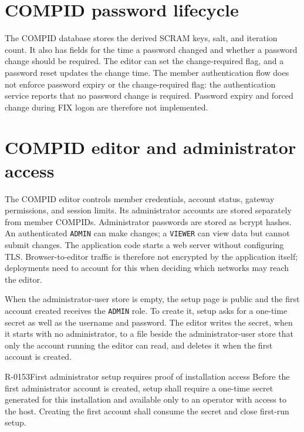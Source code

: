 \section{COMPID password lifecycle}
\label{sec:security:compid_password_lifecycle}

The COMPID database stores the derived SCRAM keys, salt, and iteration count.
It also has fields for the time a password changed and whether a password
change should be required. The editor can set the change-required flag, and a
password reset updates the change time. The member authentication flow does
not enforce password expiry or the change-required flag: the authentication
service reports that no password change is required. Password expiry and
forced change during FIX logon are therefore not implemented.

\section{COMPID editor and administrator access}
\label{sec:security:compid_editor}

The COMPID editor controls member credentials, account status, gateway
permissions, and session limits. Its administrator accounts are stored
separately from member COMPIDs. Administrator passwords are stored as bcrypt
hashes. An authenticated \texttt{ADMIN} can make changes; a \texttt{VIEWER}
can view data but cannot submit changes. The application code starts a web
server without configuring TLS. Browser-to-editor traffic is therefore not
encrypted by the application itself; deployments need to account for this
when deciding which networks may reach the editor.

When the administrator-user store is empty, the setup page is public and the
first account created receives the \texttt{ADMIN} role. To create it, setup
asks for a one-time secret as well as the username and password. The editor
writes the secret, when it starts with no administrator, to a file beside the
administrator-user store that only the account running the editor can read,
and deletes it when the first account is created.

\begin{requirement}{R-0153}{First administrator setup requires proof of installation access}
  Before the first administrator account is created, setup shall require a
  one-time secret generated for this installation and available only to an
  operator with access to the host. Creating the first account shall consume
  the secret and close first-run setup.
\end{requirement}
